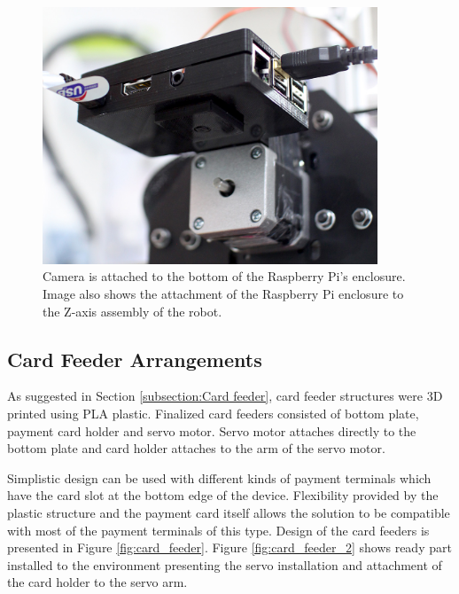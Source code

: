 \begin{figure}[ht]
  \begin{center}
    \includegraphics[width=10cm]{images/camera.jpg}
    \caption{Camera is attached to the bottom of the Raspberry Pi's enclosure. Image also shows the attachment of the Raspberry Pi enclosure to the Z-axis assembly of the robot.}
    \label{fig:camera}
  \end{center}
\end{figure}
\FloatBarrier


\subsection{Card Feeder Arrangements}
\label{subsection:Card feeder arrangements}

As suggested in Section \ref{subsection:Card feeder}, card feeder structures were 3D printed using PLA plastic. Finalized card feeders consisted of bottom plate, payment card holder and servo motor. Servo motor attaches directly to the bottom plate and card holder attaches to the arm of the servo motor.

Simplistic design can be used with different kinds of payment terminals which have the card slot at the bottom edge of the device. Flexibility provided by the plastic structure and the payment card itself allows the solution to be compatible with most of the payment terminals of this type. Design of the card feeders is presented in Figure \ref{fig:card_feeder}. Figure \ref{fig:card_feeder_2} shows ready part installed to the environment presenting the servo installation and attachment of the card holder to the servo arm.

